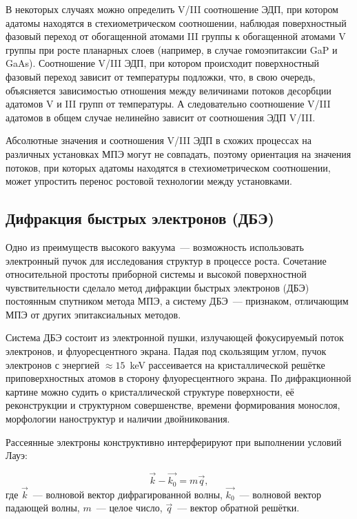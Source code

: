В некоторых случаях можно определить V/III соотношение ЭДП, при котором адатомы
находятся в стехиометрическом соотношении, наблюдая поверхностный фазовый
переход от обогащенной атомами III группы к обогащенной атомами V группы при
росте планарных слоев (например, в случае гомоэпитаксии GaP и GaAs).
Соотношение V/III ЭДП, при котором происходит поверхностный фазовый переход
зависит от температуры подложки, что, в свою очередь, объясняется зависимостью
отношения между величинами потоков десорбции адатомов V и III групп от
температуры. А следовательно соотношение V/III адатомов в общем случае
нелинейно зависит от соотношения ЭДП V/III.

Абсолютные значения и соотношения V/III ЭДП в схожих процессах на различных
установках МПЭ могут не совпадать, поэтому ориентация на значения потоков, при
которых адатомы находятся в стехиометрическом соотношении, может упростить
перенос ростовой технологии между установками.

\subsection{Дифракция быстрых электронов (ДБЭ)}\label{subsec:ch2/sec1/sub2}

Одно из преимуществ высокого вакуума~--- возможность использовать электронный
пучок для исследования структур в процессе роста. Сочетание относительной
простоты приборной системы и высокой поверхностной чувствительности сделало
метод дифракции быстрых электронов (ДБЭ) постоянным спутником метода МПЭ, а
систему ДБЭ~--- признаком, отличающим МПЭ от других эпитаксиальных методов.

Система ДБЭ состоит из электронной пушки, излучающей фокусируемый поток
электронов, и флуоресцентного экрана. Падая под скользящим углом, пучок
электронов с энергией \(\approx 15\)~\si{\kilo\electronvolt} рассеивается на
кристаллической решётке приповерхностных атомов в сторону флуоресцентного
экрана. По дифракционной картине можно судить о кристаллической структуре
поверхности, её реконструкции и структурном совершенстве, времени формирования
монослоя, морфологии наноструктур и наличии двойникования.

Рассеянные электроны конструктивно интерферируют при выполнении условий Лауэ:

\begin{equation} \label{eq:eq_2} \vec{k} - \vec{k_0} = m\vec{q}, \end{equation}
где \(\vec{k}\)~--- волновой вектор дифрагированной волны, \(\vec{k_0}\)~---
волновой вектор падающей волны, \(m\)~--- целое число, \(\vec{q}\)~--- вектор
обратной решётки.

